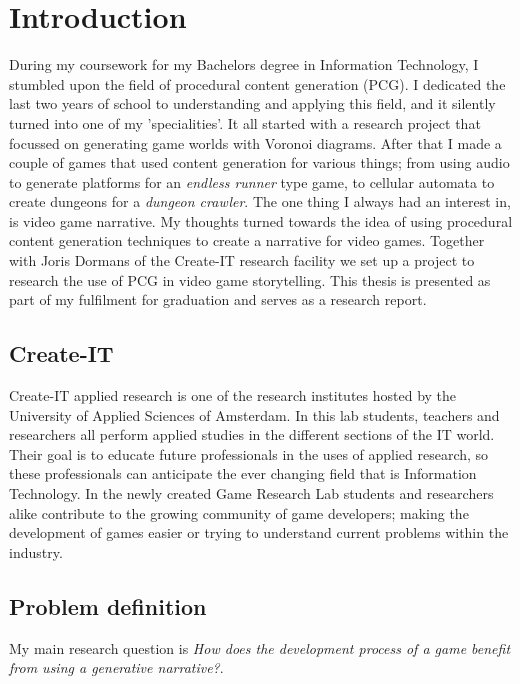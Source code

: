 \chapter{Introduction}
During my coursework for my Bachelors degree in Information Technology, I stumbled upon the field of procedural content generation (PCG). I dedicated the last two years of school to understanding and applying this field, and it silently turned into one of my 'specialities'. It all started with a research project that focussed on generating game worlds with Voronoi diagrams. After that I made a couple of games that used content generation for various things; from using audio to generate platforms for an \textit{endless runner} type game, to cellular automata to create dungeons for a \textit{dungeon crawler}.
The one thing I always had an interest in, is video game narrative. My thoughts turned towards the idea of using procedural content generation techniques to create a narrative for video games. Together with Joris Dormans of the Create-IT research facility we set up a project to research the use of PCG in video game storytelling. This thesis is presented as part of my fulfilment for graduation and serves as a research report.

\section{Create-IT}
Create-IT applied research is one of the research institutes hosted by the University of Applied Sciences of Amsterdam. In this lab students, teachers and researchers all perform applied studies in the different sections of the IT world. Their goal is to educate future professionals in the uses of applied research, so these professionals can anticipate the ever changing field that is Information Technology.
In the newly created Game Research Lab students and researchers alike contribute to the growing community of game developers; making the development of games easier or trying to understand current problems within the industry.

\section{Problem definition}
My main research question is \textit{How does the development process of a \rogue game benefit from using a generative narrative?}. 

